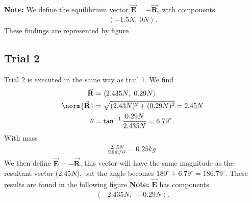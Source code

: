 \documentclass{report}
\begin{document}
    \bigbreak \noindent 
    \textbf{Note:} We define the equilibrium vector $\vec{\mathbf{E}} = -\vec{\mathbf{R}}$, with components 
    \begin{align*}
        \left\langle -1.5N,\ 0N \right\rangle
    .\end{align*}
    \bigbreak \noindent 
    These findings are represented by figure \thefigtitle
    \pagebreak \bigbreak \noindent 
    \begin{figure}[ht]
        \centering
        \label{fig:fig8}
    \end{figure}

    \bigbreak \noindent 
    \subsection{Trial 2}
    \bigbreak \noindent 
    Trial 2 is executed in the same way as trail 1. We find
    \begin{align*}
        \vec{\mathbf{R}} &= \left\langle 2.435N,\ 0.29N \right\rangle \\
        \norm{\vec{\mathbf{R}}} &= \sqrt{(2.43N)^{2} + (0.29N)^{2}} = 2.45N\\
        \theta &= \tan^{-1}{\frac{0.29N}{2.435N}} = 6.79^{\circ}
    .\end{align*}
    With mass
    \begin{align*}
        \frac{2.45N}{9.8 m/s^{2}} = 0.25kg
    .\end{align*}
    \bigbreak \noindent 
    We then define $\vec{\mathbf{E}} = -\vec{\mathbf{R}}$, this vector will have the same magnitude as the resultant vector ($2.45N$), but the angle becomes $180^{\circ} +  6.79^{\circ} = 186.79^{\circ}$. These results are found in the following figure
    \bigbreak \noindent 
    \textbf{Note:} $\vec{\mathbf{E}}$ has components 
    \begin{align*}
        \left\langle -2.435N,\ -0.29N \right\rangle
    .\end{align*}
    \pagebreak \bigbreak \noindent 
    \begin{figure}[ht]
        \centering
        \label{fig:fig9}
    \end{figure}
    \bigbreak \noindent 
\end{document}
